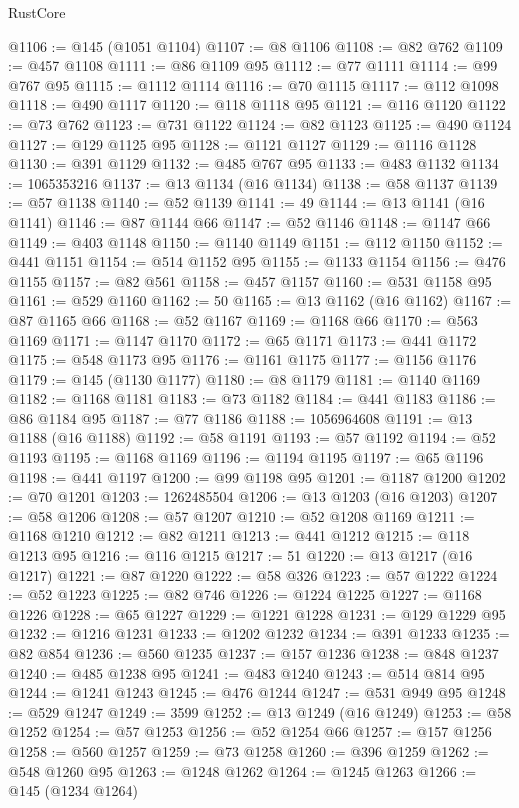 \begin{lexlean}{RustCore}
\begin{coremodule}
@1106 := @145 (@1051 @1104)
@1107 := @8 @1106
@1108 := @82 @762
@1109 := @457 @1108
@1111 := @86 @1109 @95
@1112 := @77 @1111
@1114 := @99 @767 @95
@1115 := @1112 @1114
@1116 := @70 @1115
@1117 := @112 @1098
@1118 := @490 @1117
@1120 := @118 @1118 @95
@1121 := @116 @1120
@1122 := @73 @762
@1123 := @731 @1122
@1124 := @82 @1123
@1125 := @490 @1124
@1127 := @129 @1125 @95
@1128 := @1121 @1127
@1129 := @1116 @1128
@1130 := @391 @1129
@1132 := @485 @767 @95
@1133 := @483 @1132
@1134 := 1065353216
@1137 := @13 @1134 (@16 @1134)
@1138 := @58 @1137
@1139 := @57 @1138
@1140 := @52 @1139
@1141 := 49
@1144 := @13 @1141 (@16 @1141)
@1146 := @87 @1144 @66
@1147 := @52 @1146
@1148 := @1147 @66
@1149 := @403 @1148
@1150 := @1140 @1149
@1151 := @112 @1150
@1152 := @441 @1151
@1154 := @514 @1152 @95
@1155 := @1133 @1154
@1156 := @476 @1155
@1157 := @82 @561
@1158 := @457 @1157
@1160 := @531 @1158 @95
@1161 := @529 @1160
@1162 := 50
@1165 := @13 @1162 (@16 @1162)
@1167 := @87 @1165 @66
@1168 := @52 @1167
@1169 := @1168 @66
@1170 := @563 @1169
@1171 := @1147 @1170
@1172 := @65 @1171
@1173 := @441 @1172
@1175 := @548 @1173 @95
@1176 := @1161 @1175
@1177 := @1156 @1176
@1179 := @145 (@1130 @1177)
@1180 := @8 @1179
@1181 := @1140 @1169
@1182 := @1168 @1181
@1183 := @73 @1182
@1184 := @441 @1183
@1186 := @86 @1184 @95
@1187 := @77 @1186
@1188 := 1056964608
@1191 := @13 @1188 (@16 @1188)
@1192 := @58 @1191
@1193 := @57 @1192
@1194 := @52 @1193
@1195 := @1168 @1169
@1196 := @1194 @1195
@1197 := @65 @1196
@1198 := @441 @1197
@1200 := @99 @1198 @95
@1201 := @1187 @1200
@1202 := @70 @1201
@1203 := 1262485504
@1206 := @13 @1203 (@16 @1203)
@1207 := @58 @1206
@1208 := @57 @1207
@1210 := @52 @1208 @1169
@1211 := @1168 @1210
@1212 := @82 @1211
@1213 := @441 @1212
@1215 := @118 @1213 @95
@1216 := @116 @1215
@1217 := 51
@1220 := @13 @1217 (@16 @1217)
@1221 := @87 @1220
@1222 := @58 @326
@1223 := @57 @1222
@1224 := @52 @1223
@1225 := @82 @746
@1226 := @1224 @1225
@1227 := @1168 @1226
@1228 := @65 @1227
@1229 := @1221 @1228
@1231 := @129 @1229 @95
@1232 := @1216 @1231
@1233 := @1202 @1232
@1234 := @391 @1233
@1235 := @82 @854
@1236 := @560 @1235
@1237 := @157 @1236
@1238 := @848 @1237
@1240 := @485 @1238 @95
@1241 := @483 @1240
@1243 := @514 @814 @95
@1244 := @1241 @1243
@1245 := @476 @1244
@1247 := @531 @949 @95
@1248 := @529 @1247
@1249 := 3599
@1252 := @13 @1249 (@16 @1249)
@1253 := @58 @1252
@1254 := @57 @1253
@1256 := @52 @1254 @66
@1257 := @157 @1256
@1258 := @560 @1257
@1259 := @73 @1258
@1260 := @396 @1259
@1262 := @548 @1260 @95
@1263 := @1248 @1262
@1264 := @1245 @1263
@1266 := @145 (@1234 @1264)

\end{coremodule}
\end{lexlean}
